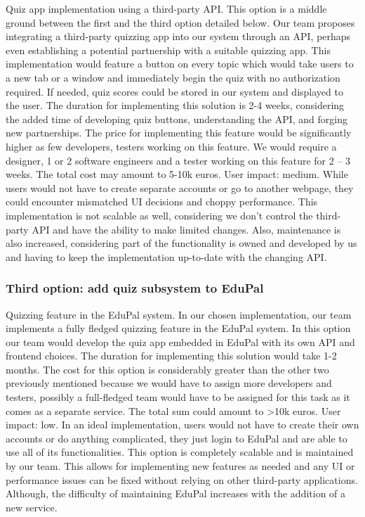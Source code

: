 \documentclass[
    english, %
]{VUMIFPSkursinis}
\begin{document}
Quiz app implementation using a third-party API. This option is a middle ground between the first and the third option detailed below. Our team proposes integrating a third-party quizzing app into our system through an API, perhaps even establishing a potential partnership with a suitable quizzing app. This implementation would feature a button on every topic which would take users to a new tab or a window and immediately begin the quiz with no authorization required. If needed, quiz scores could be stored in our system and displayed to the user. The duration for implementing this solution is 2-4 weeks, considering the added time of developing quiz buttons, understanding the API, and forging new partnerships. The price for implementing this feature would be significantly higher as few developers, testers working on this feature. We would require a designer, 1 or 2 software engineers and a tester working on this feature for 2 – 3 weeks. The total cost may amount to 5-10k euros. User impact: medium. While users would not have to create separate accounts or go to another webpage, they could encounter mismatched UI decisions and choppy performance. This implementation is not scalable as well, considering we don’t control the third-party API and have the ability to make limited changes. Also, maintenance is also increased, considering part of the functionality is owned and developed by us and having to keep the implementation up-to-date with the changing API.


\subsubsection{Third option: add quiz subsystem to EduPal}

Quizzing feature in the EduPal system. In our chosen implementation, our team implements a fully fledged quizzing feature in the EduPal system. In this option our team would develop the quiz app embedded in EduPal with its own API and frontend choices. The duration for implementing this solution would take 1-2 months. The cost for this option is considerably greater than the other two previously mentioned because we would have to assign more developers and testers, possibly a full-fledged team would have to be assigned for this task as it comes as a separate service.  The total sum could amount to >10k euros. User impact: low. In an ideal implementation, users would not have to create their own accounts or do anything complicated, they just login to EduPal and are able to use all of its functionalities. This option is completely scalable and is maintained by our team.  This allows for implementing new features as needed and any UI or performance issues can be fixed without relying on other third-party applications. Although, the difficulty of maintaining EduPal increases with the addition of a new service.
\end{document}
